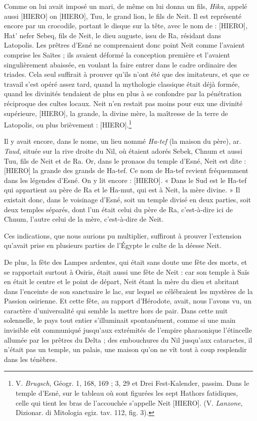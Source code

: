 \documentclass[a4paper, 11pt, oneside]{article}
\begin{document}
Comme on lui avait imposé un mari, de même on lui donna un fils, \emph{Hika}, appelé aussi [HIERO] on [HIERO], Tuu, le grand lion, le fils de Neit. Il est représenté encore par un crocodile, portant le disque sur la tête, avec le nom de : [HIERO], Hat' nefer Sebeq, fils de Neit, le dieu auguste, issu de Ra, résidant dans Latopolis. Les prêtres d'Esné ne comprenaient donc point Neit comme l'avaient comprise les Saïtes ; ils avaient déformé la conception première et l'avaient singulièrement abaissée, en voulant la faire entrer dans le cadre ordinaire des triades. Cela seul suffirait à prouver qu'ils n'ont été que des imitateurs, et que ce travail s'est opéré assez tard, quand la mythologie classique était déjà formée, quand les divinités tendaient de plus en plus à se confondre par la pénétration réciproque des cultes locaux. Neit n'en restait pas moins pour eux une divinité supérieure, [HIERO], la grande, la divine mère, la maîtresse de la terre de Latopolis, ou plus brièvement : [HIERO].\footnote{V. \emph{Brugsch}, Géogr. 1, 168, 169 ; 3, 29 et Drei Fest-Kalender, passim. Dans le temple d'Esné, sur le tableau où sont figurées les sept Hathors fatidiques, celle qui tient les bras de l'accouchée s'appelle Neit [HIERO]. (V. \emph{Lanzone}, Dizionar. di Mitologia egiz. tav. 112, fig. 3).}

Il y avait encore, dans le nome, un lieu nommé \emph{Ha-tef} (la maison du père), ar. \emph{Taud}, située sur la rive droite du Nil, où étaient adorés Sebek, Chnum et aussi Tuu, fils de Neit et de Ra. Or, dans le pronaos du temple d'Esné, Neit est dite : [HIERO] la grande des grands de Ha-tef. Ce nom de Ha-tef revient fréquemment dans les légendes d'Esné. On y lit encore : [HIERO]. « Dans le Sud est le Ha-tef qui appartient au père de Ra et le Ha-mut, qui est à Neit, la mère divine. » Il existait donc, dans le voisinage d'Esné, soit un temple divisé en deux parties, soit deux temples séparés, dont l'un était celui du père de Ra, c'est-à-dire ici de Chnum, l'autre celui de la mère, c'est-à-dire de Neit.

Ces indications, que nous aurions pu multiplier, suffiront à prouver l'extension qu'avait prise en plusieurs parties de l'Égypte le culte de la déesse Neit.

De plus, la fête des Lampes ardentes, qui était sans doute une fête des morts, et se rapportait surtout à Osiris, était aussi une fête de Neit : car son temple à Saïs en était le centre et le point de départ, Neit étant la mère du dieu et abritant dans l'enceinte de son sanctuaire le lac, sur lequel se célébraient les mystères de la Passion osirienne. Et cette fête, au rapport d'Hérodote, avait, nous l'avons vu, un caractère d'universalité qui semble la mettre hors de pair. Dans cette nuit solennelle, le pays tout entier s'illuminait spontanément, comme si une main invisible eût communiqué jusqu'aux extrémités de l'empire pharaonique l'étincelle allumée par les prêtres du Delta ; des embouchures du Nil jusqu'aux cataractes, il n'était pas un temple, un palais, une maison qu'on ne vît tout à coup resplendir dans les ténèbres.
\end{document}
